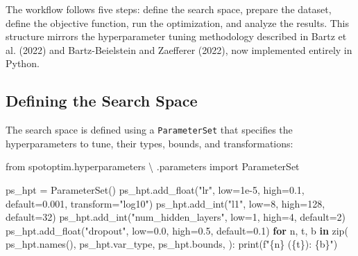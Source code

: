 \documentclass[
  twocolumn]{article}
\newenvironment{Shaded}{\begin{snugshade}}{\end{snugshade}}
\newcommand{\BuiltInTok}[1]{\textcolor[rgb]{0.00,0.23,0.31}{#1}}
\newcommand{\ControlFlowTok}[1]{\textcolor[rgb]{0.00,0.23,0.31}{\textbf{#1}}}
\newcommand{\DecValTok}[1]{\textcolor[rgb]{0.68,0.00,0.00}{#1}}
\newcommand{\FloatTok}[1]{\textcolor[rgb]{0.68,0.00,0.00}{#1}}
\newcommand{\ImportTok}[1]{\textcolor[rgb]{0.00,0.46,0.62}{#1}}
\newcommand{\KeywordTok}[1]{\textcolor[rgb]{0.00,0.23,0.31}{\textbf{#1}}}
\newcommand{\NormalTok}[1]{\textcolor[rgb]{0.00,0.23,0.31}{#1}}
\newcommand{\OperatorTok}[1]{\textcolor[rgb]{0.37,0.37,0.37}{#1}}
\newcommand{\SpecialCharTok}[1]{\textcolor[rgb]{0.37,0.37,0.37}{#1}}
\newcommand{\SpecialStringTok}[1]{\textcolor[rgb]{0.13,0.47,0.30}{#1}}
\newcommand{\StringTok}[1]{\textcolor[rgb]{0.13,0.47,0.30}{#1}}
\begin{document}
The workflow follows five steps: define the search space, prepare the
dataset, define the objective function, run the optimization, and
analyze the results. This structure mirrors the hyperparameter tuning
methodology described in Bartz et al. (2022) and Bartz-Beielstein and
Zaefferer (2022), now implemented entirely in Python.

\subsection{Defining the Search Space}\label{defining-the-search-space}

The search space is defined using a \texttt{ParameterSet} that specifies
the hyperparameters to tune, their types, bounds, and transformations:

\begin{Shaded}
\begin{Highlighting}[]
\ImportTok{from}\NormalTok{ spotoptim.hyperparameters }\OperatorTok{\textbackslash{}}
\NormalTok{    .parameters }\ImportTok{import}\NormalTok{ ParameterSet}

\NormalTok{ps\_hpt }\OperatorTok{=}\NormalTok{ ParameterSet()}
\NormalTok{ps\_hpt.add\_float(}\StringTok{"lr"}\NormalTok{, low}\OperatorTok{=}\FloatTok{1e{-}5}\NormalTok{, high}\OperatorTok{=}\FloatTok{0.1}\NormalTok{,}
\NormalTok{    default}\OperatorTok{=}\FloatTok{0.001}\NormalTok{, transform}\OperatorTok{=}\StringTok{"log10"}\NormalTok{)}
\NormalTok{ps\_hpt.add\_int(}\StringTok{"l1"}\NormalTok{, low}\OperatorTok{=}\DecValTok{8}\NormalTok{, high}\OperatorTok{=}\DecValTok{128}\NormalTok{,}
\NormalTok{    default}\OperatorTok{=}\DecValTok{32}\NormalTok{)}
\NormalTok{ps\_hpt.add\_int(}\StringTok{"num\_hidden\_layers"}\NormalTok{,}
\NormalTok{    low}\OperatorTok{=}\DecValTok{1}\NormalTok{, high}\OperatorTok{=}\DecValTok{4}\NormalTok{, default}\OperatorTok{=}\DecValTok{2}\NormalTok{)}
\NormalTok{ps\_hpt.add\_float(}\StringTok{"dropout"}\NormalTok{, low}\OperatorTok{=}\FloatTok{0.0}\NormalTok{,}
\NormalTok{    high}\OperatorTok{=}\FloatTok{0.5}\NormalTok{, default}\OperatorTok{=}\FloatTok{0.1}\NormalTok{)}
\ControlFlowTok{for}\NormalTok{ n, t, b }\KeywordTok{in} \BuiltInTok{zip}\NormalTok{(}
\NormalTok{    ps\_hpt.names(),}
\NormalTok{    ps\_hpt.var\_type,}
\NormalTok{    ps\_hpt.bounds,}
\NormalTok{):}
    \BuiltInTok{print}\NormalTok{(}\SpecialStringTok{f"}\SpecialCharTok{\{}\NormalTok{n}\SpecialCharTok{\}}\SpecialStringTok{ (}\SpecialCharTok{\{}\NormalTok{t}\SpecialCharTok{\}}\SpecialStringTok{): }\SpecialCharTok{\{}\NormalTok{b}\SpecialCharTok{\}}\SpecialStringTok{"}\NormalTok{)}
\end{Highlighting}
\end{Shaded}
\end{document}
